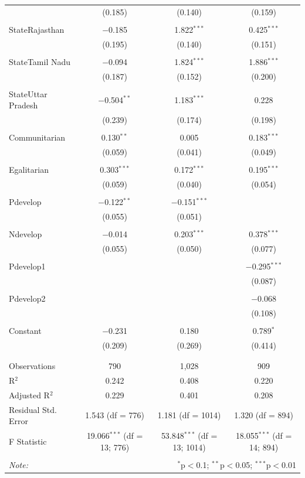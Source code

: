 \documentclass[
]{article}
\begin{document}
\begin{table}[!htbp]
\begin{tabular}{@{\extracolsep{5pt}}lccc}
  & (0.185) & (0.140) & (0.159) \\ 
  & & & \\ 
 StateRajasthan & $-$0.185 & 1.822$^{***}$ & 0.425$^{***}$ \\ 
  & (0.195) & (0.140) & (0.151) \\ 
  & & & \\ 
 StateTamil Nadu & $-$0.094 & 1.824$^{***}$ & 1.886$^{***}$ \\ 
  & (0.187) & (0.152) & (0.200) \\ 
  & & & \\ 
 StateUttar Pradesh & $-$0.504$^{**}$ & 1.183$^{***}$ & 0.228 \\ 
  & (0.239) & (0.174) & (0.198) \\ 
  & & & \\ 
 Communitarian & 0.130$^{**}$ & 0.005 & 0.183$^{***}$ \\ 
  & (0.059) & (0.041) & (0.049) \\ 
  & & & \\ 
 Egalitarian & 0.303$^{***}$ & 0.172$^{***}$ & 0.195$^{***}$ \\ 
  & (0.059) & (0.040) & (0.054) \\ 
  & & & \\ 
 Pdevelop & $-$0.122$^{**}$ & $-$0.151$^{***}$ &  \\ 
  & (0.055) & (0.051) &  \\ 
  & & & \\ 
 Ndevelop & $-$0.014 & 0.203$^{***}$ & 0.378$^{***}$ \\ 
  & (0.055) & (0.050) & (0.077) \\ 
  & & & \\ 
 Pdevelop1 &  &  & $-$0.295$^{***}$ \\ 
  &  &  & (0.087) \\ 
  & & & \\ 
 Pdevelop2 &  &  & $-$0.068 \\ 
  &  &  & (0.108) \\ 
  & & & \\ 
 Constant & $-$0.231 & 0.180 & 0.789$^{*}$ \\ 
  & (0.209) & (0.269) & (0.414) \\ 
  & & & \\ 
\hline \\[-1.8ex] 
Observations & 790 & 1,028 & 909 \\ 
R$^{2}$ & 0.242 & 0.408 & 0.220 \\ 
Adjusted R$^{2}$ & 0.229 & 0.401 & 0.208 \\ 
Residual Std. Error & 1.543 (df = 776) & 1.181 (df = 1014) & 1.320 (df = 894) \\ 
F Statistic & 19.066$^{***}$ (df = 13; 776) & 53.848$^{***}$ (df = 13; 1014) & 18.055$^{***}$ (df = 14; 894) \\ 
\hline 
\hline \\[-1.8ex] 
\textit{Note:}  & \multicolumn{3}{r}{$^{*}$p$<$0.1; $^{**}$p$<$0.05; $^{***}$p$<$0.01} \\ 
\end{tabular} 
\end{table} 
\endgroup
\end{document}
